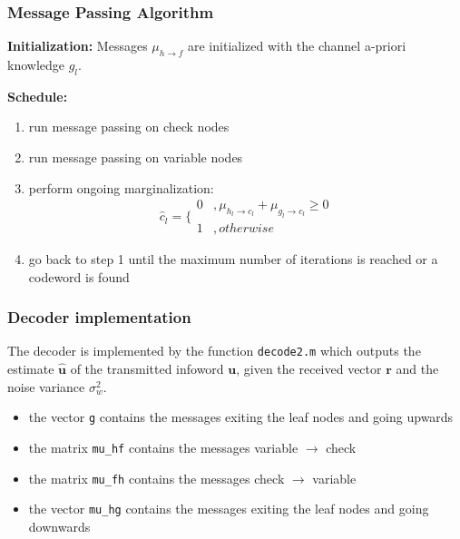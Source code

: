 \documentclass[]{beamer}
\begin{document}
\begin{frame}
\transwipe[direction=0]
\frametitle{Message Passing Algorithm}
\textbf{Initialization:} Messages $\mu_{h \rightarrow f}$ are initialized with the channel a-priori knowledge $g_l$.

\vspace{0.5cm}

\textbf{Schedule:}
\begin{enumerate}
\item run message passing on check nodes
\item run message passing on variable nodes
\item perform ongoing marginalization:
	\begin{equation*}
		\hat c_l = \bigg \{ \begin{array}{rl} 0 & ,\mu_{h_l \rightarrow c_l} + \mu_{g_l \rightarrow c_l} \geq 0 \\ 1 & ,otherwise \end{array}
	\end{equation*}
\item go back to step 1 until the maximum number of iterations is reached or a codeword is found
\end{enumerate} 

\end{frame}

\begin{frame}
\transwipe[direction=0]
\frametitle{Decoder implementation}
The decoder is implemented by the function \texttt{decode2.m} which outputs the estimate $\mathbf{\widehat u}$ of the transmitted infoword $\mathbf u$, given the received vector $\mathbf r$ and the noise variance $\sigma_w^2$.

\begin{itemize}
\item the vector \texttt{g} contains the messages exiting the leaf nodes and going upwards
\item the matrix \texttt{mu\_hf} contains the messages variable $\rightarrow$ check
\item the matrix \texttt{mu\_fh} contains the messages check $\rightarrow$ variable
\item the vector \texttt{mu\_hg} contains the messages exiting the leaf nodes and going downwards
\end{itemize}




\end{frame}
\end{document}
